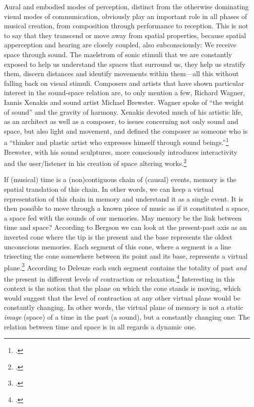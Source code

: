 \documentclass[a4paper]{article}
\begin{document}
Aural and embodied modes of perception, distinct from the otherwise dominating visual modes of communication, obviously play an important role in all phases of musical  creation, from composition through performance to reception. This is not to say that they transcend or move away from spatial properties, because spatial apperception and hearing are closely coupled, also subconsciously: We receive space through sound. The maelstrom of sonic stimuli that we are constantly exposed to help us understand the spaces that surround us, they help us stratify them, discern distances and identify movements within them---all this without falling back on visual stimuli. Composers and artists that have shown particular interest in the sound-space relation are, to only mention a few, Richard Wagner, Iannis Xenakis and sound artist Michael Brewster. Wagner spoke of ``the weight of sound'' and the gravity of harmony. Xenakis devoted much of his artistic life, as an architect as well as a composer, to issues concerning not only sound and space, but also light and movement, and defined the composer as someone who is a ``thinker and plastic artist who expresses himself through sound beings.''\footcite[][255]{xenakis71} Brewster, with his sound sculptures, more consciously introduces interactivity and the user/listener in his creation of space altering works.\footcite[][Ch. 11]{labelle06}

If (musical) time is a (non)contiguous chain of (causal) events, memory is the spatial translation of this chain. In other words, we can keep a virtual representation of this chain in memory and understand it as a single event. It is then possible to move through a known piece of music as if it constituted a space, a space fed with the sounds of our memories. May memory be the link between time and space? According to Bergson we can look at the present-past axis as an inverted cone where the tip is the present and the base represents the oldest unconscious memories. Each segment of this cone, where a segment is a line trisecting the cone somewhere between its point and its base, represents a virtual plane.\footcite[][Ch.3]{bergson91} According to Deleuze each such segment contains the totality of past \emph{and} the present in different levels of contraction or relaxation.\footcite[][60]{deleuze88} Interesting in this context is the notion that the plane on which the cone stands is moving, which would suggest that the level of contraction at any other virtual plane would be constantly changing. In other words, the virtual plane of memory is not a static \emph{image} (space) of a time in the past (a sound), but a constantly changing one: The relation between time and space is in all regards a dynamic one.
\end{document}
